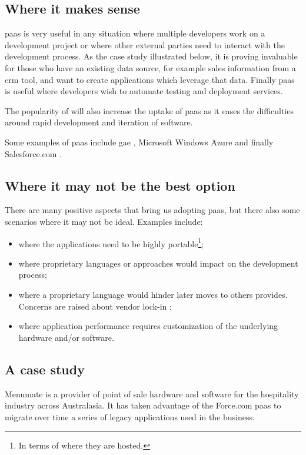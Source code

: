\subsection{Where it makes sense}
\label{sec:background-paas-whereToUse}
\ac{paas} is very useful in any situation where multiple developers work on a development project or
where other external parties need to interact with the development process. As the case study illustrated
below, it is proving invaluable for those who have an existing data source, for example sales information
from a \ac{crm} tool, and want to create applications which leverage that data. Finally \ac{paas} is useful
where developers wish to automate testing and deployment services.

The popularity of  will also increase the uptake of \ac{paas} as it eases the
difficulties around rapid development and iteration of software.

Some examples of \ac{paas} include \ac{gae} \cite{googleAppEngine}, Microsoft Windows Azure
\cite{windowsAzure} and finally Salesforce.com \cite{salesforcePlatform}.

\subsection{Where it may not be the best option}
\label{sec:background-paas-whereNotToUse}
There are many positive aspects that bring us adopting \ac{paas}, but there also some scenarios where it
may not be ideal. Examples include:

\begin{itemize}
	\item{where the applications need to be highly portable\footnote{In terms of where they are hosted.};}
	\item{where proprietary languages or approaches would impact on the development process;}
	\item{where a proprietary language would hinder later moves to others provides. Concerns are raised
		about vendor lock-in \cite{vendorLockin};}
	\item{where application performance requires customization of the underlying hardware and/or software.}
\end{itemize}

\subsection{A case study}
\label{sec:background-paas-caseStudy}
Menumate \cite{menumateCaseStudy} is a provider of point of sale hardware and software for the hospitality
industry across Australasia. It has taken advantage of the Force.com \ac{paas} to migrate over time a
series of legacy applications used in the business.

